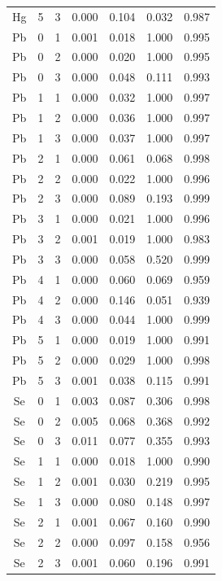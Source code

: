 \documentclass[ms, hidelinks]{uncgdissertationexp}
\theoremstyle{plain}
\theoremstyle{definition}
\theoremstyle{remark}
\begin{document}
\begin{longtable}{ccccccc}
Hg & 5 & 3 & 0.000 & 0.104 & 0.032 & 0.987\\
\rowcolor{gray!6}  Pb & 0 & 1 & 0.001 & 0.018 & 1.000 & 0.995\\
Pb & 0 & 2 & 0.000 & 0.020 & 1.000 & 0.995\\
\rowcolor{gray!6}  Pb & 0 & 3 & 0.000 & 0.048 & 0.111 & 0.993\\
Pb & 1 & 1 & 0.000 & 0.032 & 1.000 & 0.997\\
\rowcolor{gray!6}  Pb & 1 & 2 & 0.000 & 0.036 & 1.000 & 0.997\\
Pb & 1 & 3 & 0.000 & 0.037 & 1.000 & 0.997\\
\rowcolor{gray!6}  Pb & 2 & 1 & 0.000 & 0.061 & 0.068 & 0.998\\
Pb & 2 & 2 & 0.000 & 0.022 & 1.000 & 0.996\\
\rowcolor{gray!6}  Pb & 2 & 3 & 0.000 & 0.089 & 0.193 & 0.999\\
Pb & 3 & 1 & 0.000 & 0.021 & 1.000 & 0.996\\
\rowcolor{gray!6}  Pb & 3 & 2 & 0.001 & 0.019 & 1.000 & 0.983\\
Pb & 3 & 3 & 0.000 & 0.058 & 0.520 & 0.999\\
\rowcolor{gray!6}  Pb & 4 & 1 & 0.000 & 0.060 & 0.069 & 0.959\\
Pb & 4 & 2 & 0.000 & 0.146 & 0.051 & 0.939\\
\rowcolor{gray!6}  Pb & 4 & 3 & 0.000 & 0.044 & 1.000 & 0.999\\
Pb & 5 & 1 & 0.000 & 0.019 & 1.000 & 0.991\\
\rowcolor{gray!6}  Pb & 5 & 2 & 0.000 & 0.029 & 1.000 & 0.998\\
Pb & 5 & 3 & 0.001 & 0.038 & 0.115 & 0.991\\
\rowcolor{gray!6}  Se & 0 & 1 & 0.003 & 0.087 & 0.306 & 0.998\\
Se & 0 & 2 & 0.005 & 0.068 & 0.368 & 0.992\\
\rowcolor{gray!6}  Se & 0 & 3 & 0.011 & 0.077 & 0.355 & 0.993\\
Se & 1 & 1 & 0.000 & 0.018 & 1.000 & 0.990\\
\rowcolor{gray!6}  Se & 1 & 2 & 0.001 & 0.030 & 0.219 & 0.995\\
Se & 1 & 3 & 0.000 & 0.080 & 0.148 & 0.997\\
\rowcolor{gray!6}  Se & 2 & 1 & 0.001 & 0.067 & 0.160 & 0.990\\
Se & 2 & 2 & 0.000 & 0.097 & 0.158 & 0.956\\
\rowcolor{gray!6}  Se & 2 & 3 & 0.001 & 0.060 & 0.196 & 0.991\\

\end{longtable}
\end{document}
